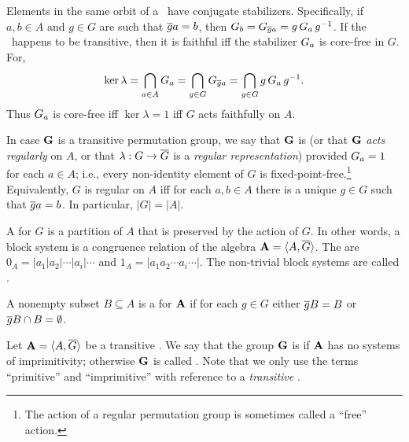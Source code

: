 Elements in the same orbit of a \Gset\
have conjugate stabilizers.  Specifically, if $a, b\in A$  and $g\in G$ are
such that $\overline{g} a = b$, then 
$G_{b} = G_{\overline{g} a} = g \,G_{a}\, g^{-1}$.
If the \Gset\ happens to be transitive, then it is faithful iff the stabilizer $G_{a}$
is core-free in $G$. For,
\[
\ker \lambda = \bigcap_{a\in A} G_{a}
= \bigcap_{g\in G} G_{\overline{g} a}
= \bigcap_{g\in G} g \,G_{a}  \,g^{-1}.
\]
Thus $G_{a}$ is core-free iff $\ker \lambda = 1$ iff $G$ acts faithfully on $A$.

In case $\mathbf{G}$ is a transitive permutation group, we say that $\mathbf{G}$ is 
\defin{regular} (or that $\mathbf{G}$ \emph{acts regularly} on $A$, or that $\lambda
: G \rightarrow \overline{G}$ is a \emph{regular representation})
provided $G_{a} = 1$ for each $a\in A$; i.e.,
every non-identity element of $G$ is fixed-point-free.\footnote{The action of a
  regular permutation group is sometimes called a ``free'' action.} Equivalently,
$G$ is regular on $A$ iff for each $a, b \in A$ there is a unique $g\in G$ such
that $\overline{g} a = b$.  In particular, $|G| = |A|$.

A  for $G$ is a partition of $A$
  that is preserved by the action of $G$.  In other words, a block system is a
  congruence relation of the algebra $\mathbf{A} = \langle A,\overline{G}\rangle$.
The  are $0_A = |a_1|a_2|\cdots|a_i|\cdots$ and 
$1_A = |a_1 a_2 \cdots a_i \cdots|$.  The non-trivial block systems are called .

A nonempty subset $B\subseteq A$ is a  for $\mathbf{A}$ 
if for each $g \in G$ either $\overline{g} B = B$ or $\overline{g} B \cap B = \emptyset$.

Let $\mathbf{A} = \langle A, \overline{G}\rangle$ be a transitive \Gset.  
We say that the group $\mathbf{G}$ is  if $\mathbf{A}$ has no systems of imprimitivity;
otherwise $\mathbf{G}$ is called \defin{imprimitive}. 
Note that we only use the terms ``primitive'' and ``imprimitive''
with reference to a \emph{transitive} \Gset.



